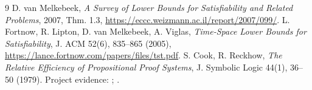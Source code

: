 \documentclass[11pt]{article}
\begin{document}
\begin{thebibliography}{9}
 D. van Melkebeek, \emph{A Survey of Lower Bounds for Satisfiability and Related Problems}, 2007, Thm. 1.3, \url{https://eccc.weizmann.ac.il/report/2007/099/}.
 L. Fortnow, R. Lipton, D. van Melkebeek, A. Viglas, \emph{Time-Space Lower Bounds for Satisfiability}, J. ACM 52(6), 835--865 (2005), \url{https://lance.fortnow.com/papers/files/tst.pdf}.
 S. Cook, R. Reckhow, \emph{The Relative Efficiency of Propositional Proof Systems}, J. Symbolic Logic 44(1), 36--50 (1979).
 Project evidence: ; .
\end{thebibliography}
\end{document}
